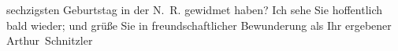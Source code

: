 \begin{ledgroupsized}[t]{13cm}
                    sechzigsten Geburtstag in der N. R. gewidmet
                    haben?\pend
           \pstart
           Ich sehe Sie hoffentlich bald wieder; und grüße Sie in freundschaftlicher
                    Bewunderung als Ihr ergebener \spacefill\mbox{Arthur Schnitzler}\pend
           \endnumbering{}\end{ledgroupsized}  \newcommand{\dateiname}{L02390}\newcommand{\titel}{Arthur Schnitzler an Thomas Mann, 26. 6. 1922}\newcommand{\editorInnen}{Martin Anton Müller und Gerd-Hermann Susen}
      